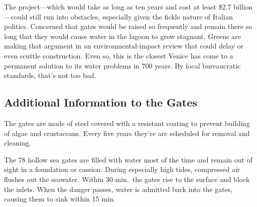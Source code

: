 The project---which would take as long as ten years and cost at least
\$2.7 billion---could still run into obstacles, especially given the
fickle nature of Italian politics. Concerned that gates would be raised
so frequently and remain there so long that they would cause water in the
lagoon to grow stagnant, Greens are making that argument in an
environmental-impact review that could delay or even scuttle construction.
Even so, this is the closest Venice has come to a permanent solution to 
its water problems in 700 years. By local bureaucratic standards, that's
not too bad.


\subsection{Additional Information to the Gates}

The gates are made of steel covered with a resistant coating to prevent
building of algae and crustaceans. Every five years they're are scheduled 
for removal and cleaning.

The 78 hollow sea gates are filled with water most of the time and remain
out of sight in a foundation or cassion. During especially high tides,
compressed air flushes out the seawater. Within 30 min.\ the gates rise
to the surface and block the inlets. When the danger passes, water is
admitted back into the gates, causing them to sink within 15 min. 

